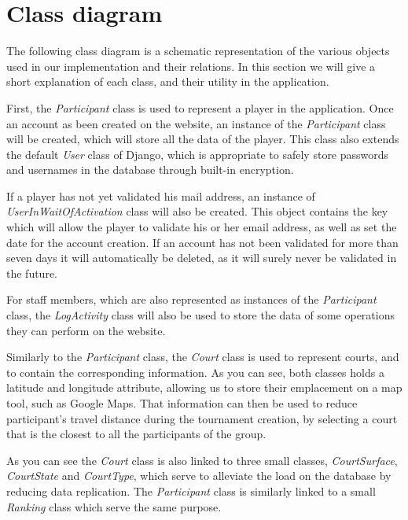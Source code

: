 \section{Class diagram}

The following class diagram is a schematic representation of the various
objects used in our implementation and their relations. In this section we will
give a short explanation of each class, and their utility in the application.\newline

First, the \textit{Participant} class is used to represent a player in the
application. Once an account as been created on the website, an instance
of the \textit{Participant} class will be created, which will store all
the data of the player. This class also extends the default \textit{User} class
of Django, which is appropriate to safely store passwords and usernames in
the database through built-in encryption.\newline

If a player has not yet validated his mail address, an instance of
\textit{UserInWaitOfActivation} class will also be created. This object
contains the key which will allow the player to validate his or her email
address, as well as set the date for the account creation. If an
account has not been validated for more than seven days it will automatically
be deleted, as it will surely never be validated in the future.\newline

For staff members, which are also represented as instances of the
\textit{Participant} class, the \textit{LogActivity} class will also be used
to store the data of some operations they can perform on the website. \newline

Similarly to the \textit{Participant} class, the \textit{Court} class is used
to represent courts, and to contain the corresponding information.
As you can see, both classes holds a latitude and longitude attribute,
allowing us to store their emplacement on a map tool, such as Google Maps.
That information can then be used to reduce participant's travel distance
during the tournament creation, by selecting a court that is the closest to
all the participants of the group. \newline

As you can see the \textit{Court} class is also linked to three small classes,
\textit{CourtSurface}, \textit{CourtState} and \textit{CourtType}, which serve
to alleviate the load on the database by reducing data replication.
The \textit{Participant} class is similarly linked to a small \textit{Ranking}
class which serve the same purpose. \newline

